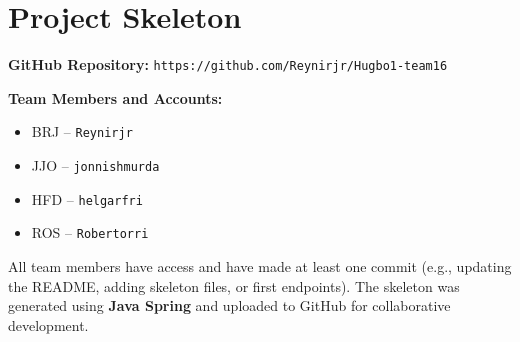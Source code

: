 \documentclass{article}
\begin{document}
\section{Project Skeleton}

\textbf{GitHub Repository:} \texttt{https://github.com/Reynirjr/Hugbo1-team16}

\textbf{Team Members and Accounts:}
\begin{itemize}
    \item BRJ -- \texttt{Reynirjr}
    \item JJO -- \texttt{jonnishmurda}
    \item HFD -- \texttt{helgarfri}
    \item ROS -- \texttt{Robertorri}
\end{itemize}

All team members have access and have made at least one commit (e.g., updating the README, adding skeleton files, or first endpoints).  
The skeleton was generated using \textbf{Java Spring} and uploaded to GitHub for collaborative development.
\end{document}
